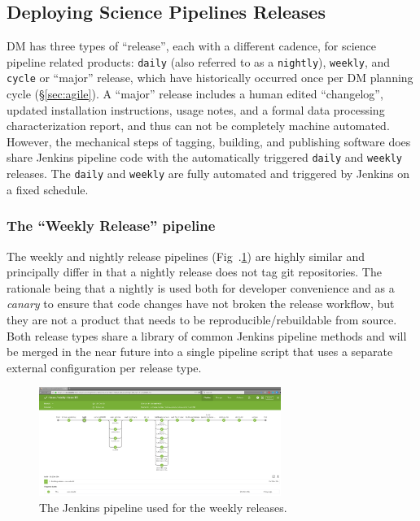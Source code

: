 \subsection{Deploying Science Pipelines Releases}
\label{sec:scipipe-deploy}

DM has three types of ``release'', each with a different cadence, for
science pipeline related products: \texttt{daily} (also referred to as a \texttt{nightly}), \texttt{weekly}, and \texttt{cycle} or ``major'' release, which have historically occurred once per DM planning cycle (\S\ref{sec:agile}).
A ``major'' release includes a human edited ``changelog'', updated installation
instructions, usage notes, and a formal data processing characterization report,
and thus can not be completely machine automated.  However, the
mechanical steps of tagging, building, and publishing software does share
Jenkins pipeline code with the automatically triggered \texttt{daily} and
\texttt{weekly} releases.
The \texttt{daily} and \texttt{weekly} are fully automated and triggered by Jenkins on a fixed
schedule.

\subsubsection{The ``Weekly Release'' pipeline}
\label{sec:releases_weekly}
\label{sec:releases_daily}

The weekly and nightly release pipelines (Fig~.\ref{fig:weekly-pipeline}) are highly similar and
principally differ in that a nightly release does not tag git
repositories.  The rationale being that a nightly is used both for
developer convenience and as a \emph{canary} to ensure that code changes have not
broken the release workflow, but they are not a product that needs to be
reproducible/rebuildable from source.
Both release types share a library of common Jenkins pipeline methods and
will be merged in the near future into a single pipeline script that uses
a separate external configuration per release type.

\begin{figure}[t]
\begin{center}
\includegraphics[width=0.7\textwidth]{pipelinedeploy-weekly-release}
\caption{The Jenkins pipeline used for the weekly releases.
\label{fig:weekly-pipeline}}
\end{center}
\end{figure}

